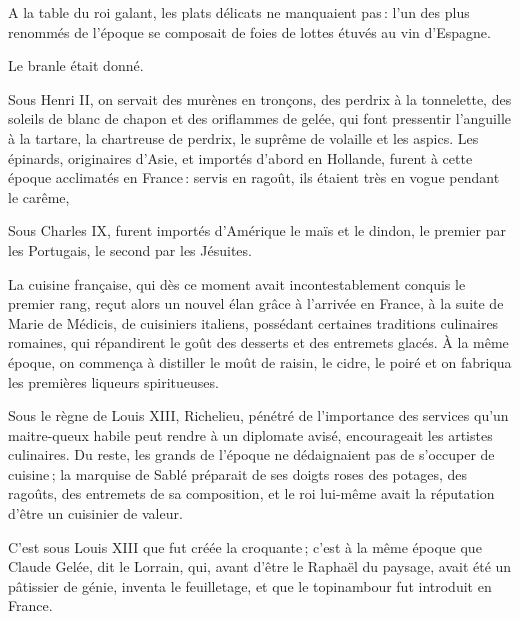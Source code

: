 A la table du roi galant, les plats délicats ne manquaient pas : l’un des plus
renommés de l'époque se composait de foies de lottes étuvés au vin d'Espagne.

Le branle était donné.

Sous Henri II, on servait des murènes en tronçons, des perdrix à la tonnelette,
des soleils de blanc de chapon et des oriflammes de gelée, qui font pressentir
l'anguille à la tartare, la chartreuse de perdrix, le suprême de volaille et
les aspics. Les épinards, originaires d'Asie, et importés d'abord en Hollande,
furent à cette époque acclimatés en France : servis en ragoût, ils étaient très
en vogue pendant le carême,

Sous Charles IX, furent importés d'Amérique le maïs et le dindon, le premier
par les Portugais, le second par les Jésuites.

La cuisine française, qui dès ce moment avait incontestablement conquis le
premier rang, reçut alors un nouvel élan grâce à l'arrivée en France, à la
suite de Marie de Médicis, de cuisiniers italiens, possédant certaines
traditions culinaires romaines, qui répandirent le goût des desserts et des
entremets glacés. À la même époque, on commença à distiller le moût de raisin,
le cidre, le poiré et on fabriqua les premières liqueurs spiritueuses.

Sous le règne de Louis XIII, Richelieu, pénétré de l'importance des services
qu'un maitre-queux habile peut rendre à un diplomate avisé, encourageait les
artistes culinaires. Du reste, les grands de l'époque ne dédaignaient pas de
s'occuper de cuisine ; la marquise de Sablé préparait de ses doigts roses des
potages, des ragoûts, des entremets de sa composition, et le roi lui-même avait
la réputation d'être un cuisinier de valeur.

C'est sous Louis XIII que fut créée la croquante ; c'est à la même époque que
Claude Gelée, dit le Lorrain, qui, avant d'être le Raphaël du paysage, avait
été un pâtissier de génie, inventa le feuilletage, et que le topinambour fut
introduit en France.

